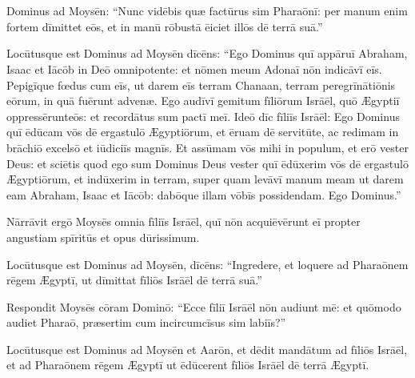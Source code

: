 \chapter{}
\thispagestyle{empty}

 Dominus ad Moysēn: ``Nunc vidēbis quæ factūrus
sim Pharaōnī: per manum enim fortem dīmittet eōs, et in
manū rōbustā ēiciet illōs dē
terrā suā.''

Locūtusque est
Dominus ad Moysēn dīcēns: ``Ego Dominus quī appāruī
Abraham, Isaac et Iācōb in Deō omnipotente:
et nōmen meum Adonaī
nōn indicāvī eīs. 
Pepigīque fœdus cum eīs, ut darem eīs terram
Chanaan, terram peregrīnātiōnis eōrum, in
quā fuērunt advenæ.  Ego audīvī gemitum fīliōrum Isrāēl, quō Ægyptiī
oppressērunt\linebreak eōs:
et recordātus sum pactī meī.  Ideō dīc
fīliīs Isrāēl: Ego Dominus quī ēdūcam vōs dē
ergastulō Ægyptiōrum, et ēruam dē servitūte, ac redimam in
brāchiō excelsō et
iūdiciīs
magnīs.  Et assūmam vōs mihi in populum, et erō vester Deus: et sciētis
quod ego sum Dominus Deus vester quī ēdūxerim vōs dē
ergastulō Ægyptiōrum,  et indūxerim in terram, super quam
levāvī manum meam ut darem eam Abraham, Isaac et Iācōb:
dabōque illam vōbīs possidendam. Ego Dominus.''

Nārrāvit ergō
Moysēs omnia fīliīs Isrāēl, quī nōn
acquiēvērunt eī propter angustiam
spīritūs et opus dūrissimum.  

Locūtusque est Dominus ad
Moysēn, dīcēns:  ``Ingredere, et
loquere ad Pharaōnem rēgem Ægyptī, ut dīmittat fīliōs
Isrāēl dē terrā suā.''

Respondit Moysēs
cōram Dominō: ``Ecce fīliī Isrāēl nōn audiunt mē: et
quōmodo audiet Pharaō, præsertim cum incircumcīsus sim labiīs?''

Locūtusque est Dominus ad
Moysēn et Aarōn, et dēdit mandātum ad
fīliōs Isrāēl, et ad Pharaōnem rēgem Ægyptī
ut ēdūcerent fīliōs Isrāēl dē terrā Ægyptī.
